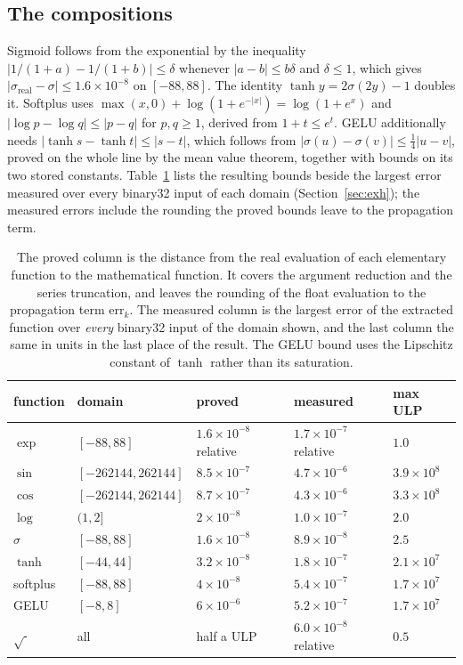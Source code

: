 \documentclass[11pt]{article}
\theoremstyle{plain}
\theoremstyle{definition}
\begin{document}
\subsection{The compositions}

Sigmoid follows from the exponential by the inequality
$|1/(1+a) - 1/(1+b)| \le \delta$ whenever $|a - b| \le b\delta$ and
$\delta \le 1$, which gives $|\sigma_{\mathrm{real}} - \sigma| \le 1.6\times10^{-8}$
on $[-88, 88]$. The identity $\tanh y = 2\sigma(2y) - 1$ doubles it. Softplus
uses $\max(x,0) + \log(1 + e^{-|x|}) = \log(1 + e^x)$ and
$|\log p - \log q| \le |p - q|$ for $p, q \ge 1$, derived from
$1 + t \le e^t$. GELU additionally needs $|\tanh s - \tanh t| \le |s - t|$,
which follows from $|\sigma(u) - \sigma(v)| \le \frac14|u - v|$, proved on the
whole line by the mean value theorem, together with bounds on its two stored
constants. Table~\ref{tab:elem} lists the resulting bounds beside the largest
error measured over every binary32 input of each domain
(Section~\ref{sec:exh}); the measured errors include the rounding the proved
bounds leave to the propagation term.

\begin{table}[t]
\centering
\small
\begin{tabular}{lllll}
\toprule
\textbf{function} & \textbf{domain} & \textbf{proved} & \textbf{measured} & \textbf{max ULP} \\
\midrule
$\exp$     & $[-88, 88]$     & $1.6\times10^{-8}$ relative & $1.7\times10^{-7}$ relative & $1.0$ \\
$\sin$     & $[-262144, 262144]$ & $8.5\times10^{-7}$ & $4.7\times10^{-6}$ & $3.9\times10^{8}$ \\
$\cos$     & $[-262144, 262144]$ & $8.7\times10^{-7}$ & $4.3\times10^{-6}$ & $3.3\times10^{8}$ \\
$\log$     & $(1, 2]$        & $2\times10^{-8}$   & $1.0\times10^{-7}$ & $2.0$ \\
$\sigma$   & $[-88, 88]$     & $1.6\times10^{-8}$ & $8.9\times10^{-8}$ & $2.5$ \\
$\tanh$    & $[-44, 44]$     & $3.2\times10^{-8}$ & $1.8\times10^{-7}$ & $2.1\times10^{7}$ \\
softplus   & $[-88, 88]$     & $4\times10^{-8}$   & $5.4\times10^{-7}$ & $1.7\times10^{7}$ \\
GELU       & $[-8, 8]$       & $6\times10^{-6}$   & $5.2\times10^{-7}$ & $1.7\times10^{7}$ \\
$\sqrt{\ }$ & all            & half a ULP         & $6.0\times10^{-8}$ relative & $0.5$ \\
\bottomrule
\end{tabular}
\caption{The proved column is the distance from the real evaluation of each
elementary function to the mathematical function. It covers the argument
reduction and the series truncation, and leaves the rounding of the float
evaluation to the propagation term $\mathrm{err}_k$. The measured column is the
largest error of the extracted function over \emph{every} binary32 input of the
domain shown, and the last column the same in units in the last place of the
result. The GELU bound uses the Lipschitz constant of $\tanh$ rather than its
saturation.}
\label{tab:elem}
\end{table}
\end{document}

